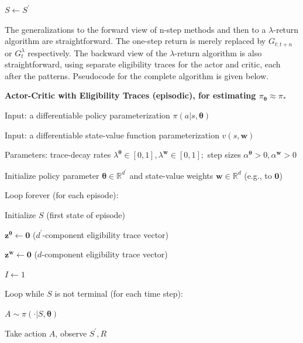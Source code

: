 \documentclass{article}
\begin{document}
\hspace{1cm} $S \leftarrow S ^ { \prime }$

The generalizations to the forward view of n-step methods and then to a $\lambda$-return algorithm are straightforward. The one-step return is merely replaced by $G _ { t : t + n }$ or $G _ { t } ^ { \lambda }$ respectively. 
The backward view of the $\lambda$-return algorithm is also straightforward, using separate eligibility traces for the actor and critic, each after the patterns. Pseudocode for the complete algorithm is given below.

\textbf{Actor-Critic with Eligibility Traces (episodic), for estimating $\pi_{\pmb{\theta}} \approx \pi_*$}

Input: a differentiable policy parameterization $\pi ( a | s , \pmb { \theta } )$

Input: a differentiable state-value function parameterization $\hat { v } ( s , \mathbf { w } )$

Parameters: trace-decay rates $\lambda ^ { \pmb { \theta } } \in [ 0 , 1 ] ,   \lambda ^ { \mathbf { w } } \in [ 0 , 1 ] ;$ step sizes $\alpha ^ { \pmb { \theta } } > 0 ,   \alpha ^ { \mathbf { w } } > 0$

Initialize policy parameter $\pmb { \theta } \in \mathbb { R } ^ { d ^ { \prime } }$ and state-value weights $\mathbf { w } \in \mathbb { R } ^ { d }$ (e.g., to $\mathbf { 0 }$)

Loop forever (for each episode):

\hspace{.5cm} Initialize $S$ (first state of episode)

\hspace{.5cm} $\mathbf { z } ^ { \pmb { \theta } } \gets \mathbf { 0 }$ ($d^{ \prime }$-component eligibility trace vector)

\hspace{.5cm} $\mathbf { z } ^ { \mathbf { w } } \leftarrow \mathbf { 0 }$ ($d$-component eligibility trace vector)

\hspace{.5cm} $I \gets 1$

\hspace{.5cm} Loop while $S$ is not terminal (for each time step):

\hspace{1cm} $A \sim \pi ( \cdot | S , \pmb { \theta } )$

\hspace{1cm} Take action $A$, observe $S ^ { \prime } , R$
\end{document}
